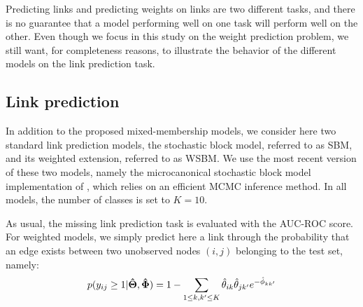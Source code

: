Predicting links and predicting weights on links are two different tasks, and there is no guarantee that a model performing well on one task will perform well on the other. Even though we focus in this study on the weight prediction problem, we still want, for completeness reasons, to illustrate the behavior of the different models on the link prediction task.

\subsection{Link prediction}

In addition to the proposed mixed-membership models, we consider here two standard link prediction models, the stochastic block model, referred to as SBM, and its weighted extension, referred to as WSBM. We use the most recent version of these two models, namely the microcanonical stochastic block model implementation of \cite{peixoto2018nonparametric}, which relies on an efficient MCMC inference method. In all models, the number of classes is set to $K=10$. 

As usual, the missing link prediction task is evaluated with the AUC-ROC score. For weighted models, we simply predict here a link through the probability that an edge exists between two unobserved nodes $(i,j)$ belonging to the test set, namely:
\[
p(y_{ij} \geq 1 | \boldsymbol{\hat\Theta}, \boldsymbol{\hat\Phi}) = 1 - \sum_{1 \le k,k' \le K} \hat\theta_{ik} \hat\theta_{jk'} e^{-\hat\phi_{kk'}}
\]


